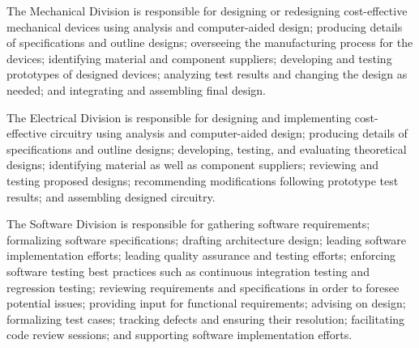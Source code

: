 The Mechanical Division is responsible for designing or redesigning cost-effective mechanical devices using analysis and computer-aided design; producing details of specifications and outline designs; overseeing the manufacturing process for the devices; identifying material and component suppliers; developing and testing prototypes of designed devices; analyzing test results and changing the design as needed; and integrating and assembling final design.

The Electrical Division is responsible for designing and implementing cost-effective circuitry using analysis and computer-aided design; producing details of specifications and outline designs; developing, testing, and evaluating theoretical designs; identifying material as well as component suppliers; reviewing and testing proposed designs; recommending modifications following prototype test results; and assembling designed circuitry.

The Software Division is responsible for gathering software requirements; formalizing software specifications; drafting architecture design; leading software implementation efforts; leading quality assurance and testing efforts; enforcing software testing best practices such as continuous integration testing and regression testing; reviewing requirements and specifications in order to foresee potential issues; providing input for functional requirements; advising on design; formalizing test cases; tracking defects and ensuring their resolution; facilitating code review sessions; and supporting software implementation efforts.